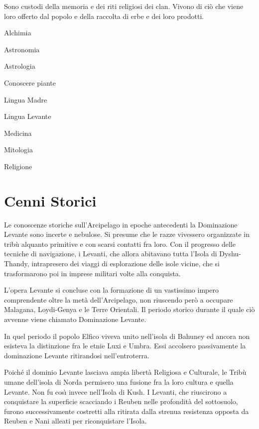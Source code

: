 
Sono custodi della memoria e dei riti religiosi dei clan. Vivono di ci\`o
che viene loro offerto dal popolo e della raccolta di erbe e dei loro prodotti.

\begin{abilist}
\item Alchimia
\item Astronomia
\item Astrologia
\item Conoscere piante
\item Lingua Madre
\item Lingua Levante
\item Medicina
\item Mitologia
\item Religione
\end{abilist}
\fi

\vfill
\pagebreak
\section{Cenni Storici}

Le conoscenze storiche sull'Arcipelago in epoche antecedenti la
Dominazione Levante sono incerte e nebulose. Si presume che le razze
vivessero organizzate in trib\`u alquanto primitive e con scarsi
contatti fra loro. Con il progresso delle tecniche di navigazione, i
Levanti, che allora abitavano tutta l'Isola di Dyshu-Thandy,
intrapresero dei viaggi di esplorazione delle isole vicine, che si
trasformarono poi in imprese militari volte alla conquista.

L'opera Levante si concluse con la formazione di un vastissimo impero
comprendente oltre la met\`a dell'Arcipelago, non riuscendo per\`o a
occupare  Malagana, Loydi-Genya e le Terre Orientali. Il
periodo storico durante il quale ci\`o avvenne viene chiamato
Dominazione Levante.

In quel periodo il popolo Elfico viveva unito nell'isola di Bahuney ed
ancora non esisteva la distinzione fra le etnie Luxi e Umbra.  Essi
accolsero passivamente la dominazione Levante ritirandosi
nell'entroterra.

Poich\'e il dominio Levante lasciava ampia libert\`a Religiosa e
Culturale, le Trib\`u umane dell'isola di Norda permisero una fusione
fra la loro cultura e quella Levante. Non fu cos\`{\i}  invece nell'Isola
di Kush. I Levanti, che riuscirono a conquistare la superficie
scacciando i Reuben nelle profondit\`a del sottosuolo, furono
successivamente costretti alla ritirata dalla strenua resistenza
opposta da Reuben e Nani alleati per riconquistare l'Isola.

